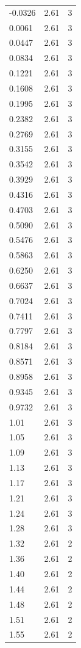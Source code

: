 \begin{longtable}{lrr}
  -0.0326 & 2.61 & 3 \\
  0.0061 & 2.61 & 3 \\
  0.0447 & 2.61 & 3 \\
  0.0834 & 2.61 & 3 \\
  0.1221 & 2.61 & 3 \\
  0.1608 & 2.61 & 3 \\
  0.1995 & 2.61 & 3 \\
  0.2382 & 2.61 & 3 \\
  0.2769 & 2.61 & 3 \\
  0.3155 & 2.61 & 3 \\
  0.3542 & 2.61 & 3 \\
  0.3929 & 2.61 & 3 \\
  0.4316 & 2.61 & 3 \\
  0.4703 & 2.61 & 3 \\
  0.5090 & 2.61 & 3 \\
  0.5476 & 2.61 & 3 \\
  0.5863 & 2.61 & 3 \\
  0.6250 & 2.61 & 3 \\
  0.6637 & 2.61 & 3 \\
  0.7024 & 2.61 & 3 \\
  0.7411 & 2.61 & 3 \\
  0.7797 & 2.61 & 3 \\
  0.8184 & 2.61 & 3 \\
  0.8571 & 2.61 & 3 \\
  0.8958 & 2.61 & 3 \\
  0.9345 & 2.61 & 3 \\
  0.9732 & 2.61 & 3 \\
  1.01 & 2.61 & 3 \\
  1.05 & 2.61 & 3 \\
  1.09 & 2.61 & 3 \\
  1.13 & 2.61 & 3 \\
  1.17 & 2.61 & 3 \\
  1.21 & 2.61 & 3 \\
  1.24 & 2.61 & 3 \\
  1.28 & 2.61 & 3 \\
  1.32 & 2.61 & 2 \\
  1.36 & 2.61 & 2 \\
  1.40 & 2.61 & 2 \\
  1.44 & 2.61 & 2 \\
  1.48 & 2.61 & 2 \\
  1.51 & 2.61 & 2 \\
  1.55 & 2.61 & 2 \\

\end{longtable}
